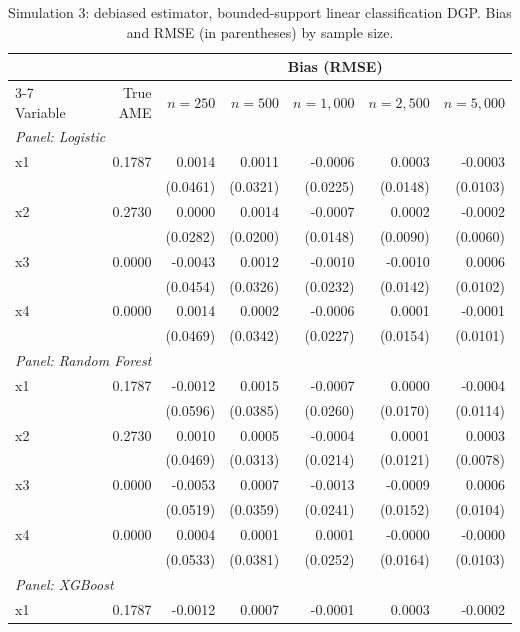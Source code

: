 \begin{table}[htbp]
\centering
\small
\begin{threeparttable}
\caption{Simulation 3: debiased estimator, bounded-support linear classification DGP. Bias and RMSE (in parentheses) by sample size.}
\label{tab:sim3_bias_classification_linear_uniform}
\begin{tabular}{lrrrrrr}
\toprule
 & & \multicolumn{5}{c}{Bias (RMSE)} \\
\cmidrule(lr){3-7}
Variable & True AME & $n=250$ & $n=500$ & $n=1,000$ & $n=2,500$ & $n=5,000$ \\
\midrule
\multicolumn{7}{l}{\textit{Panel: Logistic}} \\
\quad x1 & 0.1787 & 0.0014 & 0.0011 & -0.0006 & 0.0003 & -0.0003 \\
 &  & (0.0461) & (0.0321) & (0.0225) & (0.0148) & (0.0103) \\
\quad x2 & 0.2730 & 0.0000 & 0.0014 & -0.0007 & 0.0002 & -0.0002 \\
 &  & (0.0282) & (0.0200) & (0.0148) & (0.0090) & (0.0060) \\
\quad x3 & 0.0000 & -0.0043 & 0.0012 & -0.0010 & -0.0010 & 0.0006 \\
 &  & (0.0454) & (0.0326) & (0.0232) & (0.0142) & (0.0102) \\
\quad x4 & 0.0000 & 0.0014 & 0.0002 & -0.0006 & 0.0001 & -0.0001 \\
 &  & (0.0469) & (0.0342) & (0.0227) & (0.0154) & (0.0101) \\
\midrule
\multicolumn{7}{l}{\textit{Panel: Random Forest}} \\
\quad x1 & 0.1787 & -0.0012 & 0.0015 & -0.0007 & 0.0000 & -0.0004 \\
 &  & (0.0596) & (0.0385) & (0.0260) & (0.0170) & (0.0114) \\
\quad x2 & 0.2730 & 0.0010 & 0.0005 & -0.0004 & 0.0001 & 0.0003 \\
 &  & (0.0469) & (0.0313) & (0.0214) & (0.0121) & (0.0078) \\
\quad x3 & 0.0000 & -0.0053 & 0.0007 & -0.0013 & -0.0009 & 0.0006 \\
 &  & (0.0519) & (0.0359) & (0.0241) & (0.0152) & (0.0104) \\
\quad x4 & 0.0000 & 0.0004 & 0.0001 & 0.0001 & -0.0000 & -0.0000 \\
 &  & (0.0533) & (0.0381) & (0.0252) & (0.0164) & (0.0103) \\
\midrule
\multicolumn{7}{l}{\textit{Panel: XGBoost}} \\
\quad x1 & 0.1787 & -0.0012 & 0.0007 & -0.0001 & 0.0003 & -0.0002 \\

\end{tabular}
\end{threeparttable}
\end{table}
